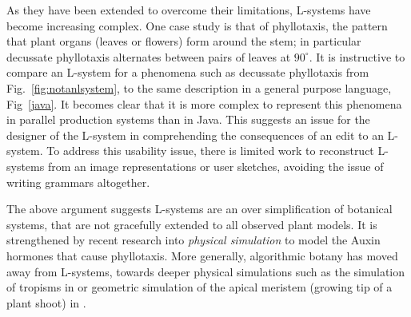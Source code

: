 



As they have been extended to overcome their limitations, L-systems have become increasing complex. One case study is that of phyllotaxis, the pattern that plant organs (leaves or flowers) form around the stem; in particular decussate phyllotaxis alternates between pairs of leaves at $90^\circ$. It is instructive to compare an L-system for a phenomena such as decussate phyllotaxis from Fig.~\ref{fig:notanlsystem}, to the same description in a general purpose language, Fig~\ref{java}. It becomes clear that it is more complex to represent this phenomena in parallel production systems than in Java. This suggests an issue for the designer of the L-system in comprehending the consequences of an edit to an L-system. To address this usability issue, there is limited work to  reconstruct L-systems from an image representations \cite{Vstava10,Shlyakhter01} or user sketches\cite{Anastacio09}, avoiding the issue of writing grammars altogether. 

The above argument suggests L-systems are an over simplification of botanical systems, that are not gracefully extended to all observed plant models. It is strengthened by recent research into \emph{physical simulation} to model the Auxin hormones that cause phyllotaxis\cite{Smith06}. More generally, algorithmic botany has moved away from L-systems, towards deeper physical simulations such as the simulation of tropisms in \cite{Palubicki09} or geometric simulation of the apical meristem (growing tip of a plant shoot) in \cite{Nakielski00}. 

